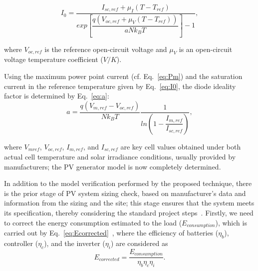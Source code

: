 \documentclass[journal]{IEEEtran}
\begin{document}
\begin{equation}
\label{eq:I0}
I_{0} = \dfrac{I_{sc,ref} + \mu_{I}(T - T_{ref})}{exp \left[ \dfrac{q(V_{oc,ref} + \mu_{V} (T - T_{ref}))}{aNk_{B}T}    \right] -1},
\end{equation}

\noindent where $ V_{oc,ref} $ is the reference open-circuit voltage and $ \mu_{V} $ is an open-circuit voltage temperature coefficient ($ V/K $).

Using the maximum power point current (cf. Eq.~\eqref{eq:Pm}) and the saturation current in the reference temperature given by Eq.~\eqref{eq:I0}, the diode ideality factor is determined by Eq.~\eqref{eq:a}:
\begin{equation}
\label{eq:a}
a = \dfrac{q(V_{m,ref}-V_{oc,ref})}{Nk_{B}T} \dfrac{1}{ln \left( 1 - \dfrac{I_{m,ref}}{I_{sc,ref}}  \right) },
\end{equation}

\noindent where $V_{mref}$, $V_{oc,ref}$, $I_{m,ref}$, and $I_{sc,ref}$ are key cell values obtained under both actual cell temperature and solar irradiance conditions, usually provided by manufacturers; the PV generator model is now completely determined.
%
%
%
%
%
%

In addition to the model verification performed by the proposed technique, there is the prior stage of PV system sizing check, based on manufacturer's data and information from the sizing and the site; this stage ensures that the system meets its specification, thereby considering the standard project steps~\cite{Pinho}.
%
Firstly, we need to correct the energy consumption estimated to the load ($E_{consumption}$), which is carried out by Eq.~\eqref{eq:Ecorrected}~\cite{Pinho}, where the efficiency of batteries ($\eta_{b}$), controller ($\eta_{c}$), and the inverter ($\eta_{i}$) are considered as
\begin{equation}
\label{eq:Ecorrected}
E_{corrected} = \dfrac{E_{consumption}}{ \eta_{b} \eta_{c} \eta_{i} }.
\end{equation}
\end{document}
